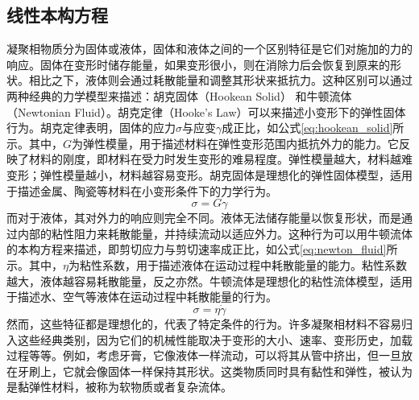 \subsection{线性本构方程}
凝聚相物质分为固体或液体，固体和液体之间的一个区别特征是它们对施加的力的响应。固体在变形时储存能量，如果变形很小，则在消除力后会恢复到原来的形状。相比之下，液体则会通过耗散能量和调整其形状来抵抗力\cite{ricarteTutorialReviewLinear2024,yaoInelasticFluidModels2024}。这种区别可以通过两种经典的力学模型来描述：胡克固体（Hookean Solid） 和牛顿流体（Newtonian Fluid）。胡克定律（Hooke's Law）可以来描述小变形下的弹性固体行为。胡克定律表明，固体的应力$\sigma$与应变$\gamma$成正比，如公式\eqref{eq:hookean_solid}所示。其中，$G$为弹性模量，用于描述材料在弹性变形范围内抵抗外力的能力。它反映了材料的刚度，即材料在受力时发生变形的难易程度。弹性模量越大，材料越难变形；弹性模量越小，材料越容易变形。胡克固体是理想化的弹性固体模型，适用于描述金属、陶瓷等材料在小变形条件下的力学行为\cite{sunReviewConstitutiveModels2024}。
\begin{equation}
	\sigma = G \gamma  \label{eq:hookean_solid}
\end{equation}
而对于液体，其对外力的响应则完全不同。液体无法储存能量以恢复形状，而是通过内部的粘性阻力来耗散能量，并持续流动以适应外力。这种行为可以用牛顿流体的本构方程来描述，即剪切应力与剪切速率成正比，如公式\eqref{eq:newton_fluid}所示。其中，$\eta$为粘性系数，用于描述液体在运动过程中耗散能量的能力。粘性系数越大，液体越容易耗散能量，反之亦然。牛顿流体是理想化的粘性流体模型，适用于描述水、空气等液体在运动过程中耗散能量的行为\cite{ricarteTutorialReviewLinear2024}。
\begin{equation}
	\sigma = \eta \dot{\gamma}  \label{eq:newton_fluid}
\end{equation}
然而，这些特征都是理想化的，代表了特定条件的行为。许多凝聚相材料不容易归入这些经典类别，因为它们的机械性能取决于变形的大小、速率、变形历史，加载过程等等。例如，考虑牙膏，它像液体一样流动，可以将其从管中挤出，但一旦放在牙刷上，它就会像固体一样保持其形状。这类物质同时具有黏性和弹性，被认为是黏弹性材料，被称为软物质或者复杂流体\cite{songNonMaxwellianViscoelasticStress2023}。


